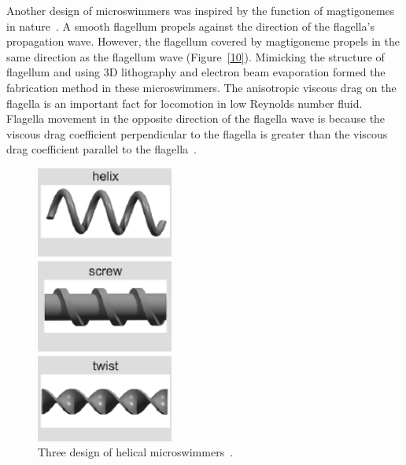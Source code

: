 \documentclass[12pt,a4paper,titlepage]{report}
\begin{document}
Another design of microswimmers was inspired by the function of magtigonemes in nature~\citep{tottori2013artificial}.
 A smooth flagellum propels against the direction of the flagella\rq{}s propagation wave. However, 
the flagellum covered by magtigoneme propels in the same direction as the flagellum wave (Figure~\ref{10}). Mimicking 
the structure of flagellum and using 3D lithography and electron beam evaporation formed the fabrication 
method in these microswimmers.
The anisotropic viscous drag on the flagella is an important fact for locomotion in low Reynolds number fluid. 
Flagella movement in the opposite direction of the flagella wave is because the 
viscous drag coefficient perpendicular to the flagella is greater than the viscous drag coefficient parallel to 
the flagella~\citep{tottori2013artificial}. 



\begin{figure}
  \begin{center}
    \includegraphics[width=0.4\textwidth]{HelixShapes}
  \caption[Helical microswimmers design]{Three design of helical microswimmers~\citep{peyer2013magnetic}.}
  \label{HelixShapes}
  \end{center}
\end{figure}
\end{document}
